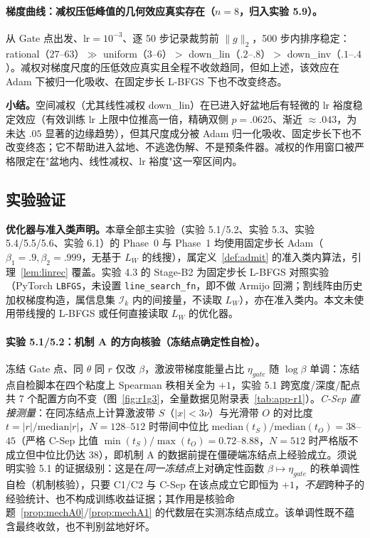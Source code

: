 \documentclass[fontset=windows,11pt]{ctexart}
\newcommand{\W}{W}
\numberwithin{equation}{section}
\begin{document}
\paragraph{梯度曲线：减权压低峰值的几何效应真实存在（$n=8$，归入实验 5.9）。}
从 Gate 点出发、lr$=10^{-3}$、逐 50 步记录裁剪前 $\|g\|_2$，500 步内排序稳定：rational（$27$--$63$）$\gg$ uniform（$3$--$6$）$>$ down\_lin（$.2$--$.8$）$>$ down\_inv（$.1$--$.4$）。减权对梯度尺度的压低效应真实且全程不收敛趋同，但如上述，该效应在 Adam 下被归一化吸收、在固定步长 L-BFGS 下也不改变终态。

\medskip
\noindent\textbf{小结。}空间减权（尤其线性减权 down\_lin）在已进入好盆地后有轻微的 lr 裕度稳定效应（有效训练 lr 上限中位推高一倍，精确双侧 $p=.0625$、渐近 $\approx.043$，为未达 $.05$ 显著的边缘趋势），但其尺度成分被 Adam 归一化吸收、固定步长下也不改变终态；它不帮助进入盆地、不逃逸伪解、不是预条件器。减权的作用窗口被严格限定在"盆地内、线性减权、lr 裕度"这一窄区间内。

\subsection{实验验证}\label{sec:theta-exp}

\noindent\textbf{优化器与准入类声明。}本章全部主实验（实验 5.1/5.2、实验 5.3、实验 5.4/5.5/5.6、实验 6.1）的 Phase~0 与 Phase~1 均使用固定步长 Adam（$\beta_1=.9,\beta_2=.999$，无基于 $L_\W$ 的线搜），属定义~\ref{def:admit} 的准入类内算法，引理~\ref{lem:linrec} 覆盖。实验 4.3 的 Stage-B2 为固定步长 L-BFGS 对照实验（PyTorch \texttt{LBFGS}，未设置 \texttt{line\_search\_fn}，即不做 Armijo 回溯；割线阵由历史加权梯度构造，属信息集 $\mathcal I_k$ 内的间接量，不读取 $L_\W$），亦在准入类内。本文未使用带线搜的 L-BFGS 或任何直接读取 $L_\W$ 的优化器。

\paragraph{实验 5.1/5.2：机制 A 的方向核验（冻结点确定性自检）。}
冻结 Gate 点、同 $\theta$ 同 $r$ 仅改 $\beta$，激波带梯度能量占比 $\eta_{gate}$ 随 $\log\beta$ 单调：冻结点自检脚本在四个粘度上 Spearman 秩相关全为 $+1$，实验 5.1 跨宽度/深度/配点共 7 个配置方向不变（图~\ref{fig:r1g3}，全量数据见附录表~\ref{tab:app-r1}）。\emph{C-Sep 直接测量}：在同冻结点上计算激波带 $S$（$|x|<3\nu$）与光滑带 $O$ 的对比度 $t=|r|/\mathrm{median}|r|$，$N=128$--$512$ 时带间中位比 $\mathrm{median}(t_S)/\mathrm{median}(t_O)=38$--$45$（严格 C-Sep 比值 $\min(t_S)/\max(t_O)=0.72$--$8.88$，$N=512$ 时严格版不成立但中位比仍达 $38$），即机制 A 的数据前提在僵硬端冻结点上经验成立。须说明实验 5.1 的证据级别：这是在\emph{同一冻结点}上对确定性函数 $\beta\mapsto\eta_{gate}$ 的秩单调性自检（机制核验），只要 C1/C2 与 C-Sep 在该点成立它即恒为 $+1$，\emph{不是}跨种子的经验统计、也不构成训练收益证据；其作用是核验命题~\ref{prop:mechA0}/\ref{prop:mechA1} 的代数层在实测冻结点成立。该单调性既不蕴含最终收敛，也不判别盆地好坏。
\end{document}
